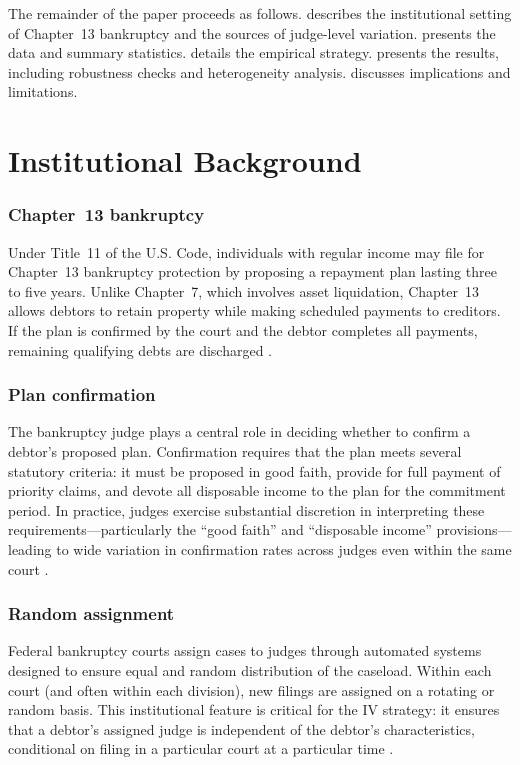 \documentclass[12pt]{article}
\begin{document}
The remainder of the paper proceeds as follows.  describes the institutional setting of Chapter~13 bankruptcy and the sources of judge-level variation.  presents the data and summary statistics.  details the empirical strategy.  presents the results, including robustness checks and heterogeneity analysis.  discusses implications and limitations.

\section{Institutional Background}
\label{sec:background}

\subsubsection*{Chapter~13 bankruptcy} Under Title~11 of the U.S. Code, individuals with regular income may file for Chapter~13 bankruptcy protection by proposing a repayment plan lasting three to five years. Unlike Chapter~7, which involves asset liquidation, Chapter~13 allows debtors to retain property while making scheduled payments to creditors. If the plan is confirmed by the court and the debtor completes all payments, remaining qualifying debts are discharged \citep{sullivan2006}.

\subsubsection*{Plan confirmation} The bankruptcy judge plays a central role in deciding whether to confirm a debtor's proposed plan. Confirmation requires that the plan meets several statutory criteria: it must be proposed in good faith, provide for full payment of priority claims, and devote all disposable income to the plan for the commitment period. In practice, judges exercise substantial discretion in interpreting these requirements---particularly the ``good faith'' and ``disposable income'' provisions---leading to wide variation in confirmation rates across judges even within the same court \citep{braucher2012}.

\subsubsection*{Random assignment} Federal bankruptcy courts assign cases to judges through automated systems designed to ensure equal and random distribution of the caseload. Within each court (and often within each division), new filings are assigned on a rotating or random basis. This institutional feature is critical for the IV strategy: it ensures that a debtor's assigned judge is independent of the debtor's characteristics, conditional on filing in a particular court at a particular time \citep{dobbie2015, chang2016}.
\end{document}
